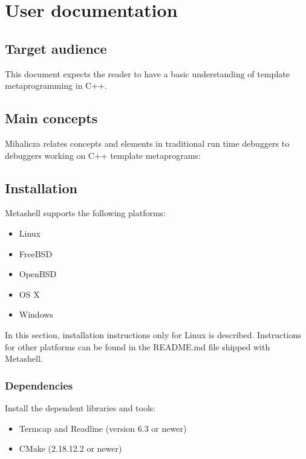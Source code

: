 

\chapter{User documentation}

\section{Target audience}

This document expects the reader to have a basic understanding of template
metaprogramming in C++.


\section{Main concepts}

Mihalicza relates concepts and elements in traditional run time debuggers to
debuggers working on C++ template metaprograms\cite{mihalicza-phd}:


\section{Installation}

Metashell supports the following platforms:
\begin{itemize}
    \item Linux
    \item FreeBSD
    \item OpenBSD
    \item OS X
    \item Windows
\end{itemize}

In this section, installation instructions only for Linux is described.
Instructions for other platforms can be found in the README.md file shipped
with Metashell.

\subsection{Dependencies}

Install the dependent libraries and tools:

\begin{itemize}
    \item Termcap and Readline (version 6.3 or newer)
    \item CMake (2.18.12.2 or newer)
\end{itemize}

